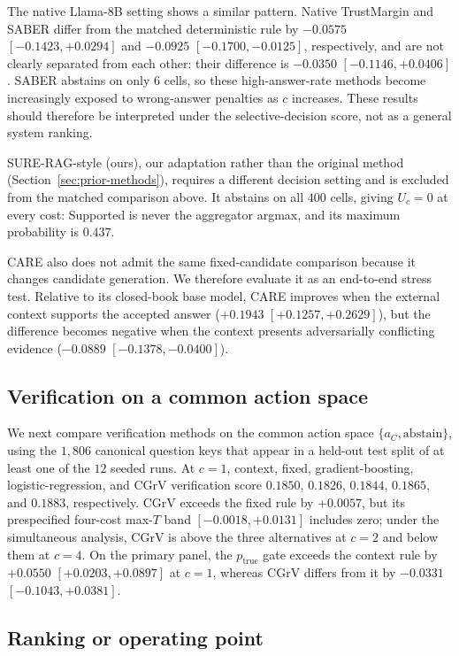 \documentclass[sigconf]{acmart}
\newcommand{\ac}{a_C}
\begin{document}
The native Llama-8B setting shows a similar pattern. Native TrustMargin
and SABER differ from the matched deterministic rule by $-0.0575$
$[-0.1423,+0.0294]$ and $-0.0925$ $[-0.1700,-0.0125]$, respectively,
and are not clearly separated from each other: their difference is
$-0.0350$ $[-0.1146,+0.0406]$. SABER abstains on only $6$ cells, so
these high-answer-rate methods become increasingly exposed to
wrong-answer penalties as $c$ increases.
These results should therefore be interpreted under the selective-decision score, not as a general system ranking.

SURE-RAG-style (ours), our adaptation rather than the original method
(Section~\ref{sec:prior-methods}), requires a different decision
setting and is excluded from the matched comparison above. It abstains
on all $400$ cells, giving $U_c=0$ at every cost: Supported is never
the aggregator argmax, and its maximum probability is $0.437$.

CARE also does not admit the same fixed-candidate comparison because it
changes candidate generation. We therefore evaluate it as an end-to-end
stress test. Relative to its closed-book base model, CARE improves when
the external context supports the accepted answer
($+0.1943$ $[+0.1257,+0.2629]$), but the difference becomes negative
when the context presents adversarially conflicting evidence
($-0.0889$ $[-0.1378,-0.0400]$).


\subsection{Verification on a common action space}
\label{sec:verification}

We next compare verification methods on the common action space
$\{\ac,\text{abstain}\}$, using the $1{,}806$ canonical question keys
that appear in a held-out test split of at least one of the $12$ seeded
runs. At $c{=}1$, context, fixed, gradient-boosting,
logistic-regression, and CGrV verification score $0.1850$, $0.1826$,
$0.1844$, $0.1865$, and $0.1883$, respectively. CGrV exceeds the fixed
rule by $+0.0057$, but its prespecified four-cost max-$T$ band
$[-0.0018,+0.0131]$ includes zero; under the simultaneous analysis,
CGrV is above the three alternatives at $c{=}2$ and below them at
$c{=}4$. On the primary panel, the $p_{\mathrm{true}}$ gate exceeds the
context rule by $+0.0550$ $[+0.0203,+0.0897]$ at $c{=}1$, whereas CGrV
differs from it by $-0.0331$ $[-0.1043,+0.0381]$.

\subsection{Ranking or operating point}
\label{sec:res-recal}
\end{document}
